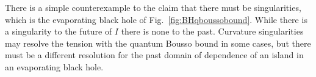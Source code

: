 \documentclass[a4paper,11pt]{article}
\newcommand{\cts}[1]{\ignorespaces}
\def\bne{\begin{equation}}
\def\ene{\end{equation}}
\newcommand{\del}{\partial}
\begin{document}


There is a simple counterexample to the claim that there must be singularities, which is the evaporating black hole of Fig.~\ref{fig:BHqboussobound}. While there is a singularity to the future of $I$ there is none to the past. Curvature singularities may resolve the tension with the quantum Bousso bound in some cases, but there must be a different resolution for the past domain of dependence of an island in an evaporating black hole.

%
\end{document}
